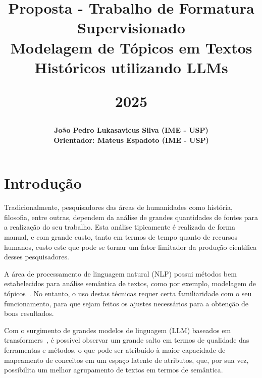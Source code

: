 \documentclass[11pt]{article}
\author{\textbf{João Pedro Lukasavicus Silva (IME - USP)}\\
        \textbf{Orientador: Mateus Espadoto (IME - USP)}\\
}
\title{\vspace{-1.0cm} \textbf{\Large Proposta - Trabalho de Formatura Supervisionado}\\
	Modelagem de Tópicos em Textos Históricos utilizando LLMs
 \vspace{0.2cm}
 
\large 2025}
\date{}
\begin{document}
\pagestyle{headings}	
\newpage
\setcounter{page}{1}
\renewcommand{\thepage}{\arabic{page}}

\setlength{\parskip}{0.5em}
	
\maketitle

\section{Introdução}
Tradicionalmente, pesquisadores das áreas de humanidades como história, filosofia, entre outras, dependem da análise de grandes quantidades de fontes para a realização do seu trabalho. Esta análise tipicamente é realizada de forma manual, e com grande custo, tanto em termos de tempo quanto de recursos humanos, custo este que pode se tornar um fator limitador da produção científica desses pesquisadores.

A área de processamento de linguagem natural (NLP) possui métodos bem estabelecidos para análise semântica de textos, como por exemplo, modelagem de tópicos~\cite{deerwester1990indexing,blei2003latent,jelodar2019latent}. No entanto, o uso destas técnicas requer certa familiaridade com o seu funcionamento, para que sejam feitos os ajustes necessários para a obtenção de bons resultados.

Com o surgimento de grandes modelos de linguagem (LLM) baseados em transformers~\cite{vaswani2017attention,devlin2019bert}, é possível observar um grande salto em termos de qualidade das ferramentas e métodos, o que pode ser atribuído à maior capacidade de mapeamento de conceitos em um espaço latente de atributos, que, por sua vez, possibilita um melhor agrupamento de textos em termos de semântica.

\end{document}
